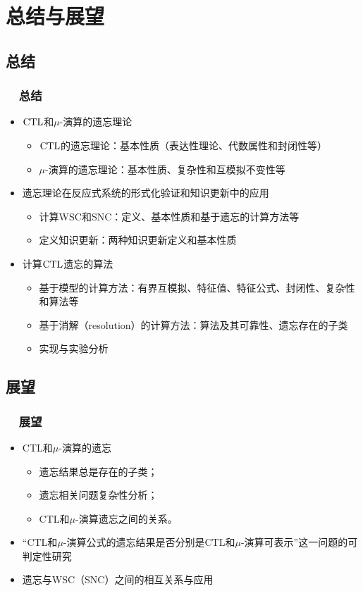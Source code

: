 \documentclass[9pt, CJK]{beamer}
\begin{document}
	
	\section{总结与展望}
	\subsection*{总结}
	\begin{frame}
		\frametitle{~~总结}
		\begin{itemize}[<+-| alert@+>]
			\vskip 8pt
			\item $\textrm{CTL}$和$\mu$-演算的遗忘理论
			\begin{itemize}
				\item $\textrm{CTL}$的遗忘理论：基本性质（表达性理论、代数属性和封闭性等）
				\item $\mu$-演算的遗忘理论：基本性质、复杂性和互模拟不变性等
			\end{itemize}
			\item 遗忘理论在反应式系统的形式化验证和知识更新中的应用
			\begin{itemize}
				\item 计算WSC和SNC：定义、基本性质和基于遗忘的计算方法等
				\item 定义知识更新：两种知识更新定义和基本性质
			\end{itemize}
			\item 计算$\textrm{CTL}$遗忘的算法
			\begin{itemize}
				\item 基于模型的计算方法：有界互模拟、特征值、特征公式、封闭性、复杂性和算法等
				\item 基于消解（resolution）的计算方法：算法及其可靠性、遗忘存在的子类
				\item 实现与实验分析
			\end{itemize}
		\end{itemize}
	\end{frame}
	
	\subsection*{展望}
	\begin{frame}
		\frametitle{~~展望}
		\begin{spacing}{1.5}
			\begin{itemize}
				\item CTL和$\mu$-演算的遗忘
					\begin{itemize}
						\item 遗忘结果总是存在的子类；
						\item 遗忘相关问题复杂性分析；
						\item CTL和$\mu$-演算遗忘之间的关系。
					\end{itemize}
				\item “CTL和$\mu$-演算公式的遗忘结果是否分别是CTL和$\mu$-演算可表示”这一问题的可判定性研究
				\item 遗忘与WSC（SNC）之间的相互关系与应用
			\end{itemize}
		\end{spacing}
	\end{frame}
	
\end{document}
